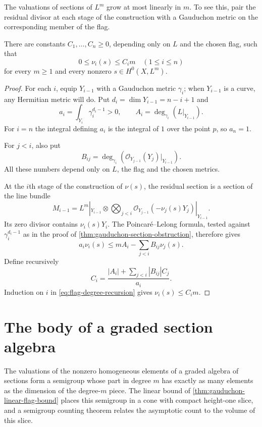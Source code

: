 The valuations of sections of $L^m$ grow at most linearly in $m$. To see this, pair the residual divisor at each stage of the construction with a Gauduchon metric on the corresponding member of the flag.

\begin{theorem}\label{thm:gauduchon-linear-flag-bound}
There are constants $C_1,\ldots,C_n\geq0$, depending only on $L$ and the chosen flag, such that
\[
 0\leq\nu_i(s)\leq C_i m
 \quad(1\leq i\leq n)
\]
for every $m\geq1$ and every nonzero $s\in H^0(X,L^m)$.
\end{theorem}
\begin{proof}
For each $i$, equip $Y_{i-1}$ with a Gauduchon metric $\gamma_i$; when $Y_{i-1}$ is a curve, any Hermitian metric will do. Put $d_i=\dim Y_{i-1}=n-i+1$ and
\[
 a_i=\int_{Y_i}\gamma_i^{d_i-1}>0,
 \qquad A_i=\deg_{\gamma_i}(L|_{Y_{i-1}}).
\]
For $i=n$ the integral defining $a_i$ is the integral of $1$ over the point $p$, so $a_n=1$.

For $j<i$, also put
\[
 B_{ij}=\deg_{\gamma_i}
 \left(\mathcal O_{Y_{j-1}}(Y_j)|_{Y_{i-1}}\right).
\]
All these numbers depend only on $L$, the flag and the chosen metrics.

At the $i$th stage of the construction of $\nu(s)$, the residual section is a section of the line bundle
\[
 M_{i-1}=L^m|_{Y_{i-1}}\otimes
     \bigotimes_{j<i}\mathcal O_{Y_{j-1}}(-\nu_j(s)Y_j)|_{Y_{i-1}}.
\]
Its zero divisor contains $\nu_i(s)Y_i$. The Poincar\'e--Lelong formula, tested against $\gamma_i^{d_i-1}$ as in the proof of \cref{thm:gauduchon-section-obstruction}, therefore gives
\begin{equation}\label{eq:flag-degree-recursion}
 a_i\nu_i(s)\leq mA_i-\sum_{j<i}B_{ij}\nu_j(s).
\end{equation}
Define recursively
\[
 C_i=\frac{|A_i|+\sum_{j<i}|B_{ij}|C_j}{a_i}.
\]
Induction on $i$ in \eqref{eq:flag-degree-recursion} gives $\nu_i(s)\leq C_i m$.
\end{proof}

\section{The body of a graded section algebra}\label{sec:graded-flag-body}

The valuations of the nonzero homogeneous elements of a graded algebra of sections form a semigroup whose part in degree $m$ has exactly as many elements as the dimension of the degree-$m$ piece. The linear bound of \cref{thm:gauduchon-linear-flag-bound} places this semigroup in a cone with compact height-one slice, and a semigroup counting theorem relates the asymptotic count to the volume of this slice.

